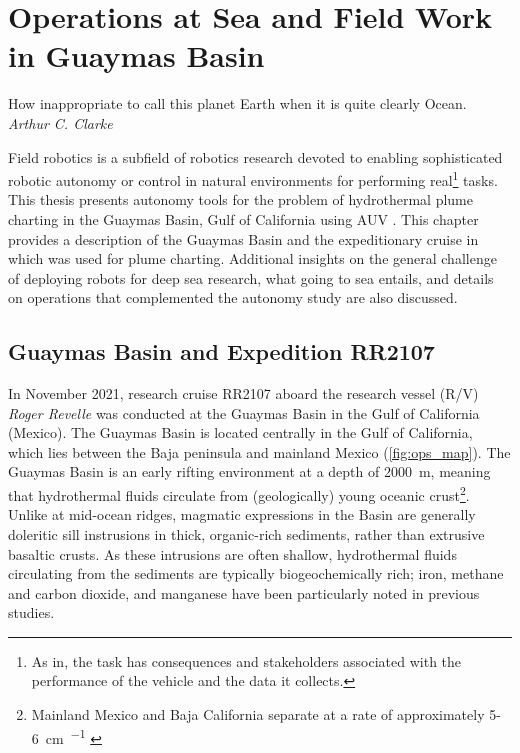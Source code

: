 \chapter{Operations at Sea and Field Work in Guaymas Basin}
\label{chap:opsatsea}

\begin{center}
    \begin{minipage}{0.6\textwidth}
      \begin{small}
        How inappropriate to call this planet Earth when it is quite clearly Ocean.\\ \emph{Arthur C. Clarke}
      \end{small}
    \end{minipage}
    \vspace{0.5cm}
\end{center}

Field robotics is a subfield of robotics research devoted to enabling sophisticated robotic autonomy or control in natural environments for performing real\footnote{As in, the task has consequences and stakeholders associated with the performance of the vehicle and the data it collects.} tasks.
This thesis presents autonomy tools for the problem of hydrothermal plume charting in the Guaymas Basin, Gulf of California using AUV \Sentry. 
This chapter provides a description of the Guaymas Basin and the expeditionary cruise in which \Sentry was used for plume charting.
Additional insights on the general challenge of deploying robots for deep sea research, what going to sea entails, and details on operations that complemented the autonomy study are also discussed. 

\section{Guaymas Basin and Expedition RR2107}
\label{sec:guaymas_description}
In November 2021, research cruise RR2107 aboard the research vessel (R/V) \emph{Roger Revelle} was conducted at the Guaymas Basin in the Gulf of California (Mexico).
The Guaymas Basin is located centrally in the Gulf of California, which lies between the Baja peninsula and mainland Mexico (\cref{fig:ops_map}).
The Guaymas Basin is an early rifting environment at a depth of \SI{2000}{\meter}\autocite{scholz2019shelf,moore1982geologic,teske2016guaymas}, meaning that hydrothermal fluids circulate from (geologically) young oceanic crust\footnote{Mainland Mexico and Baja California separate at a rate of approximately 5-\SI{6}{\cm\per\year} \autocite{lonsdale1985hydrothermal}}.
Unlike at mid-ocean ridges, magmatic expressions in the Basin are generally doleritic sill instrusions in thick, organic-rich sediments, rather than extrusive basaltic crusts\autocite{lonsdale1985hydrothermal,teske2019characteristics}.
As these intrusions are often shallow, hydrothermal fluids circulating from the sediments are typically biogeochemically rich; iron\autocite{scholz2019shelf}, methane and carbon dioxide\autocite{geilert2018formation}, and manganese\autocite{campbell1988manganese} have been particularly noted in previous studies.


